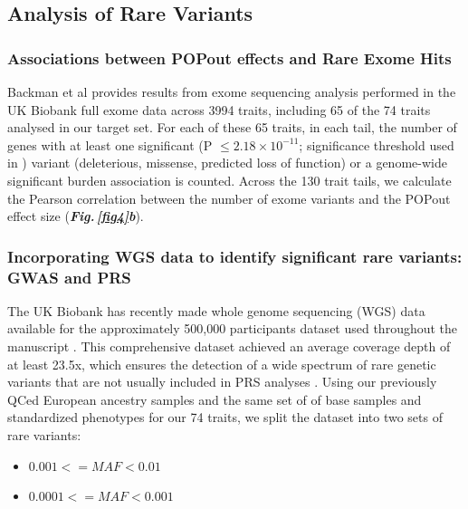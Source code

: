 \documentclass[12pt]{zHenriquesLab-StyleBioRxiv}
\newcommand\dref[2]{\normalsize{\textbf{\textit{Fig.\,\ref{#1}#2}}}\normalsize{}}
\begin{document}
{{\clearpage \newpage

{\color{blue} 
\subsection*{Analysis of Rare Variants} \label{sec:methods:rvs} 

\subsubsection*{Associations between POPout effects and Rare Exome Hits}

Backman et al \cite{Backman2021} provides results from exome sequencing analysis 
performed in the UK Biobank full exome data across 3994 traits, including 65 of 
the 74 traits analysed in our target set. For each of these 65 traits, in each tail, 
the number of genes with at least one significant (P $\le 2.18\times 10^{-11}$; significance 
threshold used in \cite{Backman2021}) variant (deleterious, missense, predicted loss of function) or a 
genome-wide significant burden association is counted. Across the 130 trait tails, we 
calculate the Pearson correlation between the number of exome variants and the POPout 
effect size (\dref{fig4}{b}). 


\subsubsection*{Incorporating WGS data to identify significant rare variants: GWAS and PRS}

The UK Biobank has recently made whole genome sequencing (WGS) data available for the
approximately 500,000 participants dataset used throughout the manuscript \cite{ukb, ukb3}.  This
comprehensive dataset achieved an average coverage depth of at least 23.5x, which ensures
the detection of a wide spectrum of rare genetic variants that are not usually included in
PRS analyses \cite{ukb2}.  Using our previously QCed European ancestry samples and the
same set of of base samples and standardized phenotypes for our 74 traits, we split the
dataset into two sets of rare variants:

\begin{itemize}
    \item[\textbf{A:}] $0.001 <= MAF < 0.01$
    \item[\textbf{B:}] $0.0001 <= MAF < 0.001$
\end{itemize}

}}}
\end{document}
